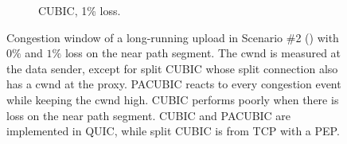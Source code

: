 \begin{figure}[t]
\begin{subfigure}{0.32\linewidth}
  \caption{CUBIC, 1\% loss.}
  \label{fig:sidekick:pacubic:cubic-loss1p}
\end{subfigure}
\caption{Congestion window of a long-running upload in Scenario \#2
() with $0\%$ and $1\%$ loss on the
near path segment. The cwnd is measured at the data sender,
except for split CUBIC whose split connection also has a cwnd at the proxy.
PACUBIC reacts to every congestion event while keeping the cwnd high.
CUBIC performs poorly when there is loss on the near path segment.
CUBIC and PACUBIC are implemented in QUIC, while split CUBIC is from
TCP with a PEP.
}
\label{fig:sidekick:pacubic}
\end{figure}
